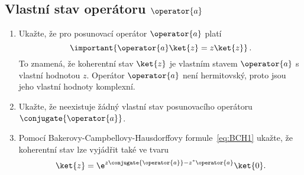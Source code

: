 \subsection{Vlastní stav operátoru $\operator{a}$}
\begin{enumerate}
\item 
    Ukažte, že pro posunovací operátor $\operator{a}$ platí
    \begin{equation}
        \label{eq:HOCoherentStateA}
        \important{\operator{a}\ket{z}=z\ket{z}}\,.
    \end{equation}
    To znamená, že koherentní stav $\ket{z}$ je vlastním stavem $\operator{a}$ 
    s vlastní hodnotou $z$.
    Operátor $\operator{a}$ není hermitovský, proto jsou jeho vlastní hodnoty komplexní.

\item 
    Ukažte, že neexistuje žádný vlastní stav posunovacího operátoru $\conjugate{\operator{a}}$.

\item 
    Pomocí Bakerovy-Campbellovy-Hausdorffovy formule~\eqref{eq:BCH1} ukažte, 
    že koherentní stav lze vyjádřit také ve tvaru
    \begin{equation}
        \ket{z}=\e^{z\conjugate{\operator{a}}-z^{*}\operator{a}}\ket{0}.
    \end{equation}
\end{enumerate}

